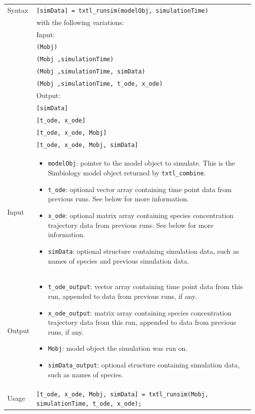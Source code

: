 \documentclass[english]{report}
\begin{document}
		\begin{tabular}{p{2cm}|p{13cm}}
			Syntax & \texttt{[simData] = txtl\_runsim(modelObj, simulationTime)}\\
			& with the following variations: \\
			& Input: \\
			& \texttt{(Mobj)}\\
			& \texttt{(Mobj ,simulationTime)}\\
			& \texttt{(Mobj ,simulationTime, simData)}\\			
			& \texttt{(Mobj ,simulationTime, t\_ode, x\_ode)}\\
			& Output: \\
			& \texttt{[simData]}\\
			& \texttt{[t\_ode, x\_ode]}\\
			& \texttt{[t\_ode, x\_ode, Mobj]}		\\	
			& \texttt{[t\_ode, x\_ode, Mobj, simData]}	\\ 
			\hline		
			
			Input &  \begin{itemize}
				\item \texttt{modelObj}: pointer to the model object to simulate. This is the Simbiology model object returned by \texttt{txtl\_combine}.
				\item \texttt{t\_ode}: optional vector array containing time point data from previous runs. See below for more information. 
				\item \texttt{x\_ode}: optional matrix array containing species concentration trajectory data from previous runs. See below for more information.
				\item \texttt{simData}: optional structure containing simulation data, such as names of species and previous simulation data.    
				\end{itemize} \\ \hline
			Output & \begin{itemize}
				\item \texttt{t\_ode\_output}: vector array containing time point data from this run, appended to data from previous runs, if any. 
				\item \texttt{x\_ode\_output}: matrix array containing species concentration trajectory data from this run, appended to data from previous runs, if any.
				\item \texttt{Mobj}: model object the simulation was run on. 
				\item \texttt{simData\_output}: optional structure containing simulation data, such as names of species.    
				\end{itemize} \\ \hline
			Usage & \texttt{[t\_ode, x\_ode, Mobj, simData] = txtl\_runsim(Mobj, simulationTime, t\_ode, x\_ode);}\\
			\end{tabular}
\end{document}

